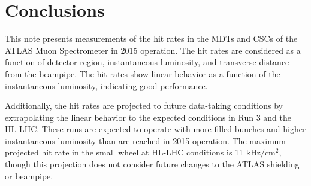 \section{Conclusions}
\label{sec:conclusions}

This note presents measurements of the hit rates in the MDTs and CSCs of the ATLAS Muon Spectrometer in 2015 operation. The hit rates are considered as a function of detector region, instantaneous luminosity, and transverse distance from the beampipe. The hit rates show linear behavior as a function of the instantaneous luminosity, indicating good performance.

Additionally, the hit rates are projected to future data-taking conditions by extrapolating the linear behavior to the expected conditions in Run 3 and the HL-LHC. These runs are expected to operate with more filled bunches and higher instantaneous luminosity than are reached in 2015 operation. The maximum projected hit rate in the small wheel at HL-LHC conditions is 11 $\text{kHz} / \text{cm}^2$, though this projection does not consider future changes to the ATLAS shielding or beampipe.

